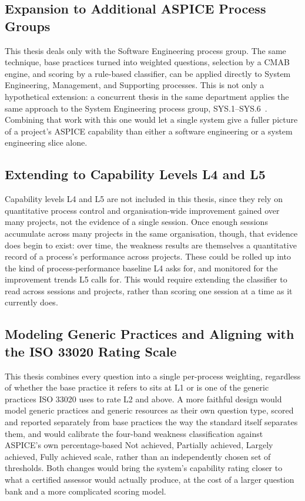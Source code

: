 \documentclass[a4paper, 12pt, oneside, openany, BCOR1cm,toc=chapterentrywithdots]{scrbook}
\begin{document}
\subsection{Expansion to Additional ASPICE Process Groups}

This thesis deals only with the Software Engineering process group. The same technique, base
practices turned into weighted questions, selection by a CMAB engine, and scoring by a
rule-based classifier, can be applied directly to System Engineering, Management, and Supporting
processes. This is not only a hypothetical extension: a concurrent thesis in the same department
applies the same approach to the System Engineering process group,
SYS.1--SYS.6~\cite{zargham2026sys}. Combining that work with this one would let a single system
give a fuller picture of a project's ASPICE capability than either a software engineering or a
system engineering slice alone.

\subsection{Extending to Capability Levels L4 and L5}

Capability levels L4 and L5 are not included in this thesis, since they rely on quantitative
process control and organisation-wide improvement gained over many projects, not the evidence of
a single session. Once enough sessions accumulate across many projects in the same organisation,
though, that evidence does begin to exist: over time, the weakness results are themselves a
quantitative record of a process's performance across projects. These could be rolled up into
the kind of process-performance baseline L4 asks for, and monitored for the improvement trends
L5 calls for. This would require extending the classifier to read across sessions and projects,
rather than scoring one session at a time as it currently does.

\subsection{Modeling Generic Practices and Aligning with the ISO 33020 Rating Scale}

This thesis combines every question into a single per-process weighting, regardless of whether
the base practice it refers to sits at L1 or is one of the generic practices ISO 33020 uses to
rate L2 and above. A more faithful design would model generic practices and generic resources as
their own question type, scored and reported separately from base practices the way the
standard itself separates them, and would calibrate the four-band weakness classification
against ASPICE's own percentage-based Not achieved, Partially achieved, Largely achieved, Fully
achieved scale, rather than an independently chosen set of thresholds. Both changes would bring
the system's capability rating closer to what a certified assessor would actually produce, at
the cost of a larger question bank and a more complicated scoring model.
\end{document}
